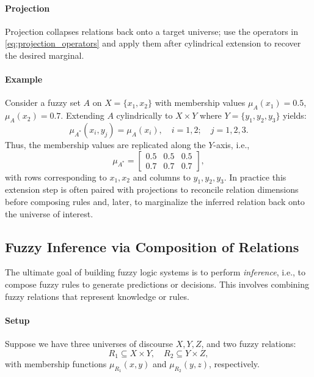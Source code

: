 \paragraph{Projection}

Projection collapses relations back onto a target universe; use the operators in \eqref{eq:projection_operators} and apply them after cylindrical extension to recover the desired marginal.

\paragraph{Example}

Consider a fuzzy set \(A\) on \(X = \{x_1, x_2\}\) with membership values \(\mu_A(x_1) = 0.5\), \(\mu_A(x_2) = 0.7\). Extending \(A\) cylindrically to \(X \times Y\) where \(Y = \{y_1, y_2, y_3\}\) yields:
\[
\mu_{A^*}(x_i, y_j) = \mu_A(x_i), \quad i=1,2; \quad j=1,2,3.
\]
Thus, the membership values are replicated along the \(Y\)-axis, i.e.,
\[
\mu_{A^*} =
\begin{bmatrix}
0.5 & 0.5 & 0.5\\
0.7 & 0.7 & 0.7
\end{bmatrix},
\]
with rows corresponding to \(x_1,x_2\) and columns to \(y_1,y_2,y_3\). In practice this extension step is often paired with projections to reconcile relation dimensions before composing rules and, later, to marginalize the inferred relation back onto the universe of interest.

\subsection{Fuzzy Inference via Composition of Relations}
\label{sec:fuzzyrelations_fuzzy_inference_via_composition_of_relations}

The ultimate goal of building fuzzy logic systems is to perform \emph{inference}, i.e., to compose fuzzy rules to generate predictions or decisions. This involves combining fuzzy relations that represent knowledge or rules.

\paragraph{Setup}

Suppose we have three universes of discourse \(X, Y, Z\), and two fuzzy relations:
\[
R_1 \subseteq X \times Y, \quad R_2 \subseteq Y \times Z,
\]
with membership functions \(\mu_{R_1}(x, y)\) and \(\mu_{R_2}(y, z)\), respectively.

